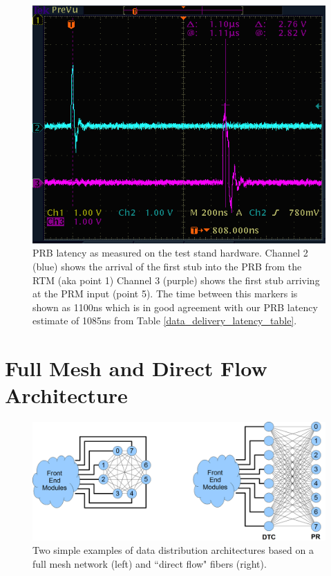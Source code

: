 \documentclass[letterpaper]{article}
\begin{document}
\begin{figure}
\centering
\includegraphics[width=12cm]{prb_latency_scope.png}
\caption{PRB latency as measured on the test stand hardware.  Channel 2 (blue) shows the arrival of the first stub into the PRB from the RTM (aka point 1)  Channel 3 (purple) shows the first stub arriving at the PRM input (point 5).  The time between this markers is shown as 1100ns which is in good agreement with our PRB latency estimate of 1085ns from Table \ref{data_delivery_latency_table}. }
\label{prb_latency_scope}
\end{figure}

\clearpage
\newpage
\appendices

\section{Full Mesh and Direct Flow Architecture}
\label{Appendix_DirectFlow}

\begin{figure}
\centering
\includegraphics[width=14cm]{arch.png}
\caption{Two simple examples of data distribution architectures based on a full mesh network (left) and ``direct flow" fibers (right).}
\label{fig_arch_compare}
\end{figure}
\end{document}
